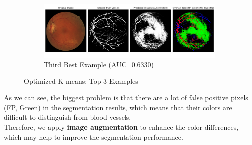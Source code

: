 \documentclass[12pt,letterpaper]{article}
\begin{document}
\begin{figure}[H]
    \ContinuedFloat
    \centering
    \begin{subfigure}[H]{\textwidth}
        \centering
        \includegraphics[scale=0.35]{Figures/3 Optimized 3rd.png}
        \vspace{-0.5cm}
        \caption{Third Best Example (AUC=0.6330)}
        \label{fig:opt3}
    \end{subfigure}
    \caption{Optimized K-means: Top 3 Examples}
    \label{fig:opt}
\end{figure}
\noindent
As we can see, the biggest problem is that there are a lot of false positive pixels (FP, Green) in the segmentation results, which means that their colors are difficult to distinguish from blood vessels. \\
Therefore, we apply \textbf{image augmentation} to enhance the color differences, which may help to improve the segmentation performance. 
\end{document}

